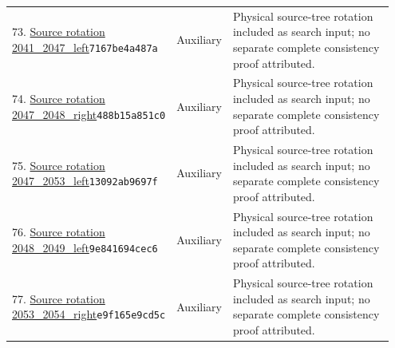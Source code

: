 \begin{longtable}{@{}p{0.27\linewidth}p{0.13\linewidth}p{0.55\linewidth}@{}}
73. \href{https://github.com/VladimirReshetnikov/ProveIt/blob/32d0d8b7d93a63ad4106c18cdb29b37927acdad2/Computability/BusyBeaver/Research/PA/docs/pa_consistency_research_2026-11-14_2/research/physical/inputs/rotations/2041_2047_left.tm}{Source rotation 2041\_\allowbreak{}2047\_\allowbreak{}left}\newline\texttt{7167be4a487a} & Auxiliary & Physical source-tree rotation included as search input; no separate complete consistency proof attributed.\\[5pt]
74. \href{https://github.com/VladimirReshetnikov/ProveIt/blob/32d0d8b7d93a63ad4106c18cdb29b37927acdad2/Computability/BusyBeaver/Research/PA/docs/pa_consistency_research_2026-11-14_2/research/physical/inputs/rotations/2047_2048_right.tm}{Source rotation 2047\_\allowbreak{}2048\_\allowbreak{}right}\newline\texttt{488b15a851c0} & Auxiliary & Physical source-tree rotation included as search input; no separate complete consistency proof attributed.\\[5pt]
75. \href{https://github.com/VladimirReshetnikov/ProveIt/blob/32d0d8b7d93a63ad4106c18cdb29b37927acdad2/Computability/BusyBeaver/Research/PA/docs/pa_consistency_research_2026-11-14_2/research/physical/inputs/rotations/2047_2053_left.tm}{Source rotation 2047\_\allowbreak{}2053\_\allowbreak{}left}\newline\texttt{13092ab9697f} & Auxiliary & Physical source-tree rotation included as search input; no separate complete consistency proof attributed.\\[5pt]
76. \href{https://github.com/VladimirReshetnikov/ProveIt/blob/32d0d8b7d93a63ad4106c18cdb29b37927acdad2/Computability/BusyBeaver/Research/PA/docs/pa_consistency_research_2026-11-14_2/research/physical/inputs/rotations/2048_2049_left.tm}{Source rotation 2048\_\allowbreak{}2049\_\allowbreak{}left}\newline\texttt{9e841694cec6} & Auxiliary & Physical source-tree rotation included as search input; no separate complete consistency proof attributed.\\[5pt]
77. \href{https://github.com/VladimirReshetnikov/ProveIt/blob/32d0d8b7d93a63ad4106c18cdb29b37927acdad2/Computability/BusyBeaver/Research/PA/docs/pa_consistency_research_2026-11-14_2/research/physical/inputs/rotations/2053_2054_right.tm}{Source rotation 2053\_\allowbreak{}2054\_\allowbreak{}right}\newline\texttt{e9f165e9cd5c} & Auxiliary & Physical source-tree rotation included as search input; no separate complete consistency proof attributed.\\[5pt]

\end{longtable}
